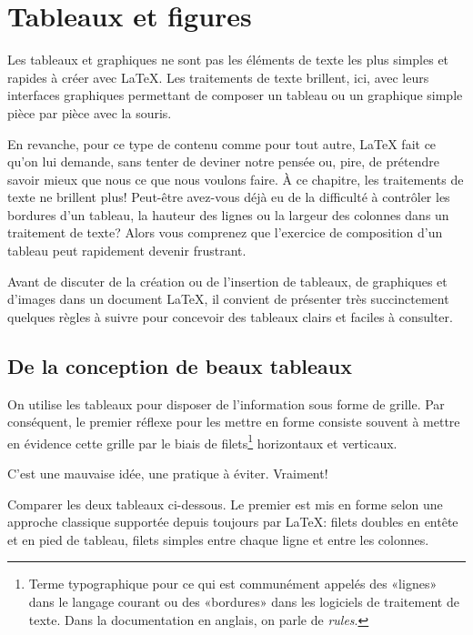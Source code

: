 \chapter{Tableaux et figures}
\label{chap:tableaux}

Les tableaux et graphiques ne sont pas les éléments de texte les plus
simples et rapides à créer avec {\LaTeX}. Les traitements de texte
brillent, ici, avec leurs interfaces graphiques permettant de composer
un tableau ou un graphique simple pièce par pièce avec la souris.

En revanche, pour ce type de contenu comme pour tout autre, {\LaTeX}
fait ce qu'on lui demande, sans tenter de deviner notre pensée ou,
pire, de prétendre savoir mieux que nous ce que nous voulons faire. À
ce chapitre, les traitements de texte ne brillent plus! Peut-être avez-vous
déjà eu de la difficulté à contrôler les bordures d'un tableau, la
hauteur des lignes ou la largeur des colonnes dans un traitement de
texte? Alors vous comprenez que l'exercice de composition d'un tableau
peut rapidement devenir frustrant.

Avant de discuter de la création ou de l'insertion de tableaux, de
graphiques et d'images dans un document {\LaTeX}, il convient de
présenter très succinctement quelques règles à suivre pour concevoir
des tableaux clairs et faciles à consulter.


\section{De la conception de beaux tableaux}
\label{sec:tableaux:booktabs}

On utilise les tableaux pour disposer de l'information sous forme de
grille. Par conséquent, le premier réflexe pour les mettre en forme
consiste souvent à mettre en évidence cette grille par le biais de
filets\footnote{%
  Terme typographique pour ce qui est communément appelés des «lignes»
  dans le langage courant ou des «bordures» dans les logiciels de
  traitement de texte. Dans la documentation en anglais, on parle de
  \emph{rules}.} %
horizontaux et verticaux.

C'est une mauvaise idée, une pratique à éviter. Vraiment!

Comparer les deux tableaux ci-dessous. Le premier est mis en forme
selon une approche classique supportée depuis toujours par {\LaTeX}:
filets doubles en entête et en pied de tableau, filets simples entre
chaque ligne et entre les colonnes.

